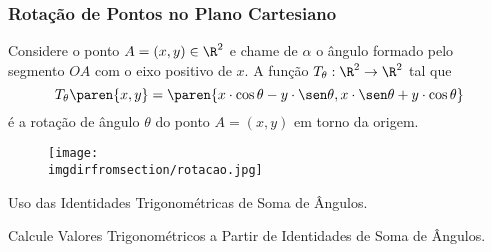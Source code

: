 \subsubsection{Rotação de Pontos no Plano Cartesiano}

\begin{definition}
Considere o ponto $A = (x, y) \in \R^2$ e chame de $\alpha$ o ângulo
formado pelo segmento $OA$ com o eixo positivo de $x$. A função
$T_{\theta} : \R^2 \to \R^2$  tal que
$$T_{\theta}\paren{x, y} = \paren{x\cdot \cos \theta - y\cdot \sen \theta, x\cdot \sen \theta + y\cdot \cos
\theta}$$ é a rotação de ângulo $\theta$ do ponto $A = (x,y)$ em
torno da origem.
%
\begin{figure}
\centering
\texttt{[image: \\imgdirfromsection/rotacao.jpg]}
\end{figure}
    
\end{definition}

\begin{onlineact}
    {Uso das Identidades Trigonométricas de Soma de Ângulos}.
\end{onlineact}

\begin{onlineact}
    {Calcule Valores Trigonométricos a Partir de Identidades de Soma de Ângulos}.
\end{onlineact}